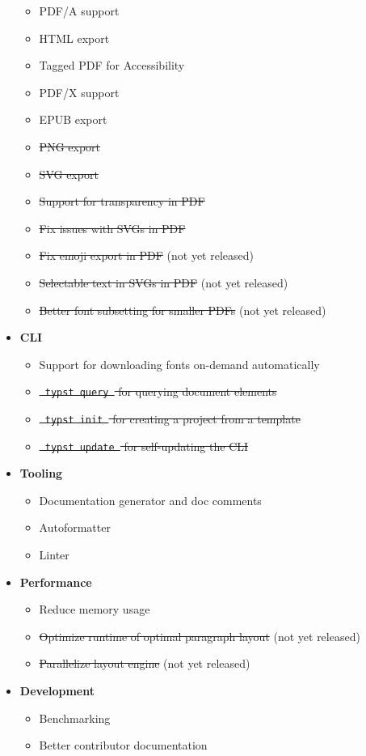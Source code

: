 \begin{itemize}
  \begin{itemize}
  \tightlist
  \item
    PDF/A support
  \item
    HTML export
  \item
    Tagged PDF for Accessibility
  \item
    PDF/X support
  \item
    EPUB export
  \item
    \st{PNG export}
  \item
    \st{SVG export}
  \item
    \st{Support for transparency in PDF}
  \item
    \st{Fix issues with SVGs in PDF}
  \item
    \st{Fix emoji export in PDF} (not yet released)
  \item
    \st{Selectable text in SVGs in PDF} (not yet released)
  \item
    \st{Better font subsetting for smaller PDFs} (not yet released)
  \end{itemize}
\item
  \textbf{CLI}

  \begin{itemize}
  \tightlist
  \item
    Support for downloading fonts on-demand automatically
  \item
    \st{\mbox{\texttt{\ typst\ query\ }} for querying document elements}
  \item
    \st{\mbox{\texttt{\ typst\ init\ }} for creating a project from a
    template}
  \item
    \st{\mbox{\texttt{\ typst\ update\ }} for self-updating the CLI}
  \end{itemize}
\item
  \textbf{Tooling}

  \begin{itemize}
  \tightlist
  \item
    Documentation generator and doc comments
  \item
    Autoformatter
  \item
    Linter
  \end{itemize}
\item
  \textbf{Performance}

  \begin{itemize}
  \tightlist
  \item
    Reduce memory usage
  \item
    \st{Optimize runtime of optimal paragraph layout} (not yet released)
  \item
    \st{Parallelize layout engine} (not yet released)
  \end{itemize}
\item
  \textbf{Development}

  \begin{itemize}
  \tightlist
  \item
    Benchmarking
  \item
    Better contributor documentation
  \end{itemize}
\end{itemize}

